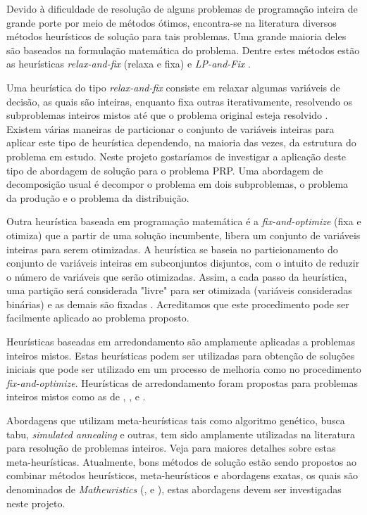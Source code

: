 \documentclass[11pt]{article}
\begin{document}
Devido à dificuldade de resolução de alguns problemas de programação inteira de grande porte por meio de métodos ótimos, encontra-se na literatura diversos métodos heurísticos de solução para tais problemas. Uma grande maioria deles são baseados na formulação matemática do problema. Dentre estes métodos estão as heurísticas \textit{relax-and-fix} (relaxa e fixa) e\textit{ LP-and-Fix} . 
 
Uma heurística do tipo \textit{relax-and-fix} consiste em relaxar algumas variáveis de decisão, as quais são inteiras, enquanto fixa outras iterativamente, resolvendo os subproblemas inteiros mistos até que o problema original esteja resolvido . Existem várias maneiras de particionar o conjunto de variáveis inteiras para aplicar este tipo de heurística dependendo, na maioria das vezes, da estrutura do problema em estudo. Neste projeto gostaríamos de investigar a aplicação deste tipo de abordagem de solução para o problema PRP. Uma abordagem de decomposição usual é decompor o problema em dois subproblemas, o problema da produção e o problema da distribuição. 
 
  Outra heurística baseada em programação matemática é a \textit{fix-and-optimize} (fixa e otimiza) que a partir de uma solução incumbente, libera um conjunto de variáveis inteiras para serem otimizadas. A heurística se baseia no particionamento do conjunto de variáveis inteiras em subconjuntos disjuntos, com o intuito de reduzir o número de variáveis que serão otimizadas. Assim, a cada passo da heurística, uma partição será considerada "livre" para ser otimizada (variáveis consideradas binárias) e as demais são fixadas . Acreditamos que este procedimento pode ser facilmente aplicado ao problema proposto. 
  
Heurísticas baseadas em arredondamento são amplamente aplicadas a problemas inteiros mistos. Estas heurísticas podem ser utilizadas para obtenção de soluções iniciais que pode ser utilizado em um processo de melhoria como no procedimento  \textit{fix-and-optimize}. Heurísticas de arredondamento foram propostas para problemas inteiros mistos como as de , ,  e .   
  
Abordagens que utilizam meta-heurísticas tais como algoritmo genético, busca tabu, \textit{simulated annealing} e outras, tem sido amplamente utilizadas na literatura para resolução de problemas inteiros. Veja   para maiores detalhes sobre estas meta-heurísticas. Atualmente, bons métodos de solução estão sendo propostos ao combinar métodos heurísticos, meta-heurísticos e abordagens exatas, os quais são denominados de \textit{Matheuristics} (,  e ), estas abordagens devem ser investigadas neste projeto. 
\end{document}
